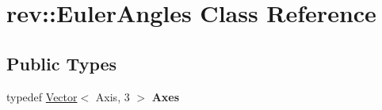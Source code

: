 \hypertarget{classrev_1_1_euler_angles}{}\section{rev\+::Euler\+Angles Class Reference}
\label{classrev_1_1_euler_angles}
\subsection*{Public Types}
\begin{DoxyCompactItemize}
\item 
\mbox{\label{classrev_1_1_euler_angles_a2004e8821ce5402e5e955efe488b63a7}} 
typedef \mbox{\hyperlink{classrev_1_1_vector}{Vector}}$<$ Axis, 3 $>$ {\bfseries Axes}
\end{DoxyCompactItemize}

